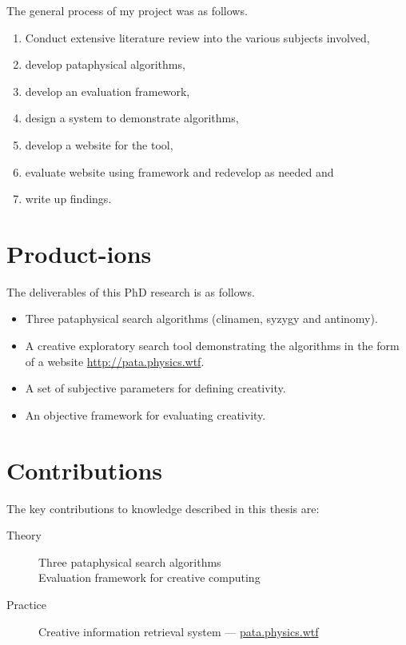 The general process of my project was as follows.

\begin{enumerate}
  \item Conduct extensive literature review into the various subjects involved,
  \item develop pataphysical algorithms,
  \item develop an evaluation framework,
  \item design a system to demonstrate algorithms,
  \item develop a website for the tool,
  \item evaluate website using framework and redevelop as needed and
  \item write up findings.
\end{enumerate}


\section{Product-ions}

The deliverables of this PhD research is as follows.

\begin{itemize}
  \item Three pataphysical search algorithms (clinamen, syzygy and antinomy).
  \item A creative exploratory search tool demonstrating the algorithms in the form of a website \url{http://pata.physics.wtf}.
  \item A set of subjective parameters for defining creativity.
  \item An objective framework for evaluating creativity.
\end{itemize}


\section{Contributions}

The key contributions to knowledge described in this thesis are:

\begin{description}
  \item [Theory] Three pataphysical search algorithms\\
                   Evaluation framework for creative computing
  \item [Practice] Creative information retrieval system --- \url{pata.physics.wtf}
\end{description}

